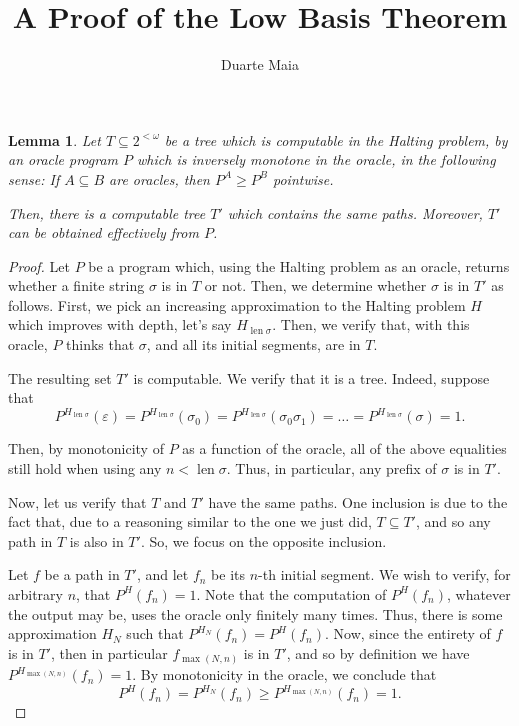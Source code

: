 \documentclass{article}
\title{A Proof of the Low Basis Theorem}
\author{Duarte Maia}
\newtheorem*{lemma}[theorem]{Lemma}
\theoremstyle{nonumberplain}
\newtheorem{proof}{Proof}
\DeclareMathOperator{\len}{\mathrm{len}}
\begin{document}
\maketitle

\begin{lemma}
Let $T \subseteq 2^{<\omega}$ be a tree which is computable in the Halting problem, by an oracle program $P$ which is inversely monotone in the oracle, in the following sense: If $A \subseteq B$ are oracles, then $P^A \geq P^B$ pointwise.

Then, there is a computable tree $T'$ which contains the same paths. Moreover, $T'$ can be obtained effectively from $P$.
\end{lemma}

\begin{proof}
Let $P$ be a program which, using the Halting problem as an oracle, returns whether a finite string $\sigma$ is in $T$ or not. Then, we determine whether $\sigma$ is in $T'$ as follows. First, we pick an increasing approximation to the Halting problem $H$ which improves with depth, let's say $H_{\len \sigma}$. Then, we verify that, with this oracle, $P$ thinks that $\sigma$, and all its initial segments, are in $T$.

The resulting set $T'$ is computable. We verify that it is a tree. Indeed, suppose that
\begin{equation}
P^{H_{\len \sigma}}(\varepsilon) = P^{H_{\len \sigma}}(\sigma_0) = P^{H_{\len \sigma}}(\sigma_0 \sigma_1) = \dots = P^{H_{\len \sigma}}(\sigma) = 1.
\end{equation}

Then, by monotonicity of $P$ as a function of the oracle, all of the above equalities still hold when using any $n < \len \sigma$. Thus, in particular, any prefix of $\sigma$ is in $T'$.

Now, let us verify that $T$ and $T'$ have the same paths. One inclusion is due to the fact that, due to a reasoning similar to the one we just did, $T \subseteq T'$, and so any path in $T$ is also in $T'$. So, we focus on the opposite inclusion.

Let $f$ be a path in $T'$, and let $f_n$ be its $n$-th initial segment. We wish to verify, for arbitrary $n$, that $P^H(f_n) = 1$. Note that the computation of $P^H(f_n)$, whatever the output may be, uses the oracle only finitely many times. Thus, there is some approximation $H_N$ such that $P^{H_N}(f_n) = P^H(f_n)$. Now, since the entirety of $f$ is in $T'$, then in particular $f_{\max(N,n)}$ is in $T'$, and so by definition we have $P^{H_{\max(N,n)}}(f_n) = 1$. By monotonicity in the oracle, we conclude that
\begin{equation}
P^H(f_n) = P^{H_N}(f_n) \geq P^{H_{\max(N,n)}}(f_n) = 1.
\end{equation}
\end{proof}
\end{document}
